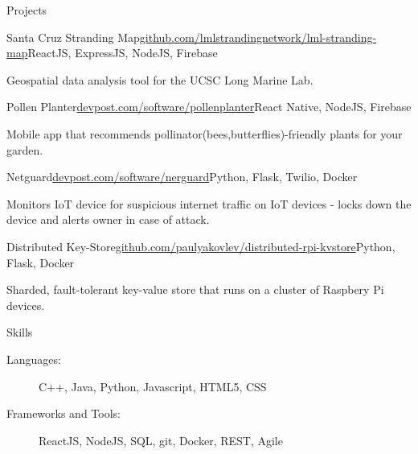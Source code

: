\documentclass{resume} %
\begin{document}

\begin{rSection}{Projects}
    \begin{rSubsection}{Santa Cruz Stranding Map}{\href{https://github.com/lmlstrandingnetwork/lml-stranding-map}{github.com/lmlstrandingnetwork/lml-stranding-map}}{ReactJS, ExpressJS, NodeJS, Firebase}{}
        \item Geospatial data analysis tool for the UCSC Long Marine Lab.
    \end{rSubsection}

    \begin{rSubsection}{Pollen Planter}{\href{https://www.devpost.com/software/pollenplanter}{devpost.com/software/pollenplanter}}{React Native, NodeJS, Firebase}{}
        \item Mobile app that recommends pollinator(bees,butterflies)-friendly plants for your garden.
    \end{rSubsection}

    \begin{rSubsection}{Netguard}{\href{https://www.devpost.com/software/netguard}{devpost.com/software/nerguard}}{Python, Flask, Twilio, Docker}{}
        \item Monitors IoT device for suspicious internet traffic on IoT devices - locks down the device and alerts owner in case of attack.
    \end{rSubsection}

    \begin{rSubsection}{Distributed Key-Store}{\href{https://github.com/paulyakovlev/distributed-rpi-kvstore}{github.com/paulyakovlev/distributed-rpi-kvstore}}{Python, Flask, Docker}{}
        \item Sharded, fault-tolerant key-value store that runs on a cluster of Raspbery Pi devices.
    \end{rSubsection}
\end{rSection}


\begin{rSection}{Skills}
    \begin{description}
    \item[Languages:] C++, Java, Python, Javascript, HTML5, CSS
    \item[Frameworks and Tools:] ReactJS, NodeJS, SQL, git, Docker, REST, Agile
    \end{description}
\end{rSection}
\end{document}
